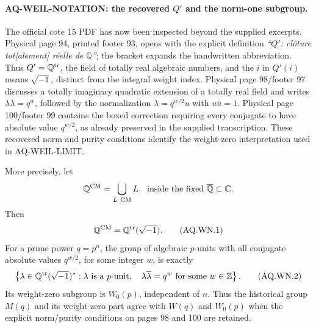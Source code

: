 \documentclass[11pt,a4paper]{article}
\theoremstyle{definition}\newtheorem{definition}[theorem]{Definition}
\theoremstyle{remark}\newtheorem{remark}[theorem]{Remark}
\begin{document}
\paragraph{AQ-WEIL-NOTATION: the recovered $Q'$ and the norm-one subgroup.}
The official cote 15 PDF has now been inspected beyond the
supplied excerpts.  Physical page 94, printed footer 93,
opens with the explicit definition
\emph{``$Q'$: cl\^oture tot[alement] r\'eelle de $\mathbb Q$''};
the bracket expands the handwritten abbreviation.
Thus $Q'=\mathbb Q^{\rm tr}$, the field of totally real
algebraic numbers, and the $i$ in $Q'(i)$ means
$\sqrt{-1}$, distinct from the integral weight index.
Physical page 98/footer 97 discusses a totally imaginary
quadratic extension of a totally real field and writes
$\lambda\overline\lambda=q^w$, followed by the
normalization $\lambda=q^{w/2}u$ with
$u\overline u=1$.
Physical page 100/footer 99 contains the boxed correction
requiring every conjugate to have absolute value $q^{w/2}$,
as already preserved in the supplied transcription.
These recovered norm and purity conditions identify the
weight-zero interpretation used in AQ-WEIL-LIMIT.

More precisely, let
\[
 \mathbb Q^{\rm CM}=\bigcup_{L\ {\mathrm{CM}}}L
 \quad\hbox{inside the fixed }\overline{\mathbb Q}\subset\mathbb C.
\]
Then
\[
 \mathbb Q^{\rm CM}=\mathbb Q^{\rm tr}(\sqrt{-1}).
 \tag{AQ.WN.1}
\]
For a prime power $q=p^n$, the group of algebraic
$p$-units with all conjugate absolute values $q^{w/2}$,
for some integer $w$, is exactly
\[
 \left\{\lambda\in\mathbb Q^{\rm tr}(\sqrt{-1})^*:
   \lambda\text{ is a $p$-unit},\quad
   \lambda\overline\lambda=q^w\text{ for some }w\in\mathbb Z
 \right\}.                                                   \tag{AQ.WN.2}
\]
Its weight-zero subgroup is $W_0(p)$, independent of $n$.
Thus the historical group $M(q)$ and its weight-zero part
agree with $W(q)$ and $W_0(p)$ when the explicit
norm/purity conditions on pages 98 and 100 are retained.
\end{document}

